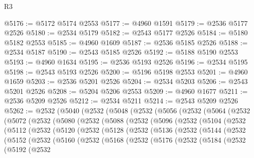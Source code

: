 \begin{lexlean}{R3}
\begin{coremodule}
@5176 := @5172 @5174 @2553
@5177 := @4960 @1591
@5179 := @2536 @5177 @2526
@5180 := @2534 @5179
@5182 := @2543 @5177 @2526
@5184 := @5180 @5182 @2553
@5185 := @4960 @1609
@5187 := @2536 @5185 @2526
@5188 := @2534 @5187
@5190 := @2543 @5185 @2526
@5192 := @5188 @5190 @2553
@5193 := @4960 @1634
@5195 := @2536 @5193 @2526
@5196 := @2534 @5195
@5198 := @2543 @5193 @2526
@5200 := @5196 @5198 @2553
@5201 := @4960 @1659
@5203 := @2536 @5201 @2526
@5204 := @2534 @5203
@5206 := @2543 @5201 @2526
@5208 := @5204 @5206 @2553
@5209 := @4960 @1677
@5211 := @2536 @5209 @2526
@5212 := @2534 @5211
@5214 := @2543 @5209 @2526
@5262 := @2532
    (@5040
      (@2532
        (@5048
          (@2532
            (@5056
              (@2532
                (@5064
                  (@2532
                    (@5072
                      (@2532
                        (@5080
                          (@2532
                            (@5088
                              (@2532
                                (@5096
                                  (@2532
                                    (@5104
                                      (@2532
                                        (@5112
                                          (@2532
                                            (@5120
                                              (@2532
                                                (@5128
                                                  (@2532
                                                    (@5136
                                                      (@2532
                                                        (@5144
                                                          (@2532
                                                            (@5152
                                                              (@2532
                                                                (@5160
                                                                  (@2532
                                                                    (@5168
                                                                      (@2532
                                                                        (@5176
                                                                          (@2532
                                                                            (@5184
                                                                              (@2532
                                                                                (@5192
                                                                                  (@2532

\end{coremodule}
\end{lexlean}
